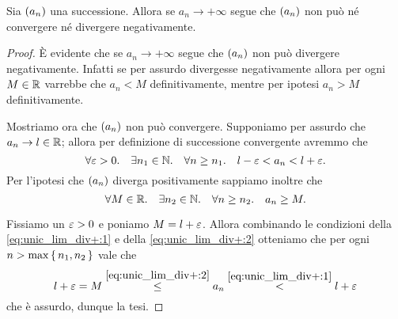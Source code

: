 \begin{lemma}\label{lem:unic_lim_div+}
    Sia $\seqn*{a}$ una successione. Allora se $a_n \to +\infty$ segue che $\seqn*{a}$ non può né convergere né divergere negativamente.
\end{lemma}
\begin{proof}
    È evidente che se $a_n \to +\infty$ segue che $\seqn*{a}$ non può divergere negativamente. Infatti se per assurdo divergesse negativamente allora per ogni $M \in \mathbb{R}$ varrebbe che $a_n < M$ definitivamente, mentre per ipotesi $a_n > M$ definitivamente.

    Mostriamo ora che $\seqn*{a}$ non può convergere. Supponiamo per assurdo che $a_n \to l \in \mathbb{R}$; allora per definizione di successione convergente avremmo che \begin{equation}
        \forall \varepsilon > 0. \quad \exists n_1 \in \mathbb{N}. \quad \forall n \geq n_1. \quad l - \varepsilon < a_n < l + \varepsilon. \label{eq:unic_lim_div+:1}\\
    \end{equation}
    Per l'ipotesi che $\seqn*{a}$ diverga positivamente sappiamo inoltre che \begin{equation}
        \forall M \in \mathbb{R}. \quad \exists n_2 \in \mathbb{N}. \quad \forall n \geq n_2. \quad a_n \geq M. \label{eq:unic_lim_div+:2}
    \end{equation}

    Fissiamo un $\varepsilon > 0$ e poniamo $M = l + \varepsilon$. Allora combinando le condizioni della \eqref{eq:unic_lim_div+:1} e della \eqref{eq:unic_lim_div+:2} otteniamo che per ogni $n > \max \left\{\,n_1, n_2\,\right\}$ vale che \[
        l + \varepsilon = M \stackrel{\eqref{eq:unic_lim_div+:2}}{\leq} a_n \stackrel{\eqref{eq:unic_lim_div+:1}}{<} l + \varepsilon   
    \] che è assurdo, dunque la tesi.
\end{proof}

